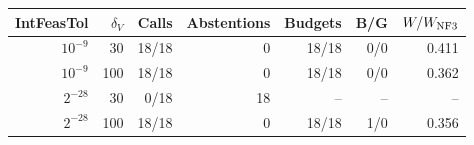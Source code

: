 \begin{tabular}{rrrrrrr}
\toprule
IntFeasTol & $\delta_V$ & Calls & Abstentions & Budgets & B/G & $W/W_{\rm NF3}$\\
\midrule
$10^{-9}$ & 30 & 18/18 & 0 & 18/18 & 0/0 & 0.411\\
$10^{-9}$ & 100 & 18/18 & 0 & 18/18 & 0/0 & 0.362\\
$2^{-28}$ & 30 & 0/18 & 18 & -- & -- & --\\
$2^{-28}$ & 100 & 18/18 & 0 & 18/18 & 1/0 & 0.356\\
\bottomrule
\end{tabular}
